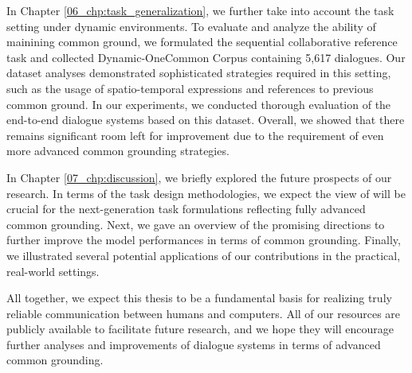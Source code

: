 In Chapter \ref{06_chp:task_generalization}, we further take into account the task setting under dynamic environments. To evaluate and analyze the ability of mainining common ground, we formulated the sequential collaborative reference task and collected Dynamic-OneCommon Corpus containing 5,617 dialogues. Our dataset analyses demonstrated sophisticated strategies required in this setting, such as the usage of spatio-temporal expressions and references to previous common ground. In our experiments, we conducted thorough evaluation of the end-to-end dialogue systems based on this dataset. Overall, we showed that there remains significant room left for improvement due to the requirement of even more advanced common grounding strategies.

In Chapter \ref{07_chp:discussion}, we briefly explored the future prospects of our research. In terms of the task design methodologies, we expect the view of \citet{pickering2004toward} will be crucial for the next-generation task formulations reflecting fully advanced common grounding. Next, we gave an overview of the promising directions to further improve the model performances in terms of common grounding. Finally, we illustrated several potential applications of our contributions in the practical, real-world settings.

All together, we expect this thesis to be a fundamental basis for realizing truly reliable communication between humans and computers. All of our resources are publicly available to facilitate future research, and we hope they will encourage further analyses and improvements of dialogue systems in terms of advanced common grounding.
